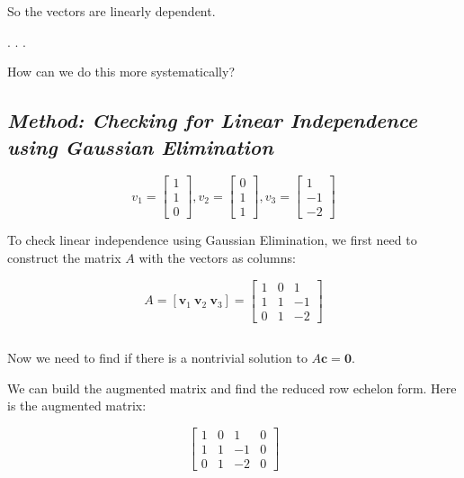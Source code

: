 \documentclass[
  letterpaper,
  DIV=11,
  numbers=noendperiod]{scrartcl}
\begin{document}
So the vectors are linearly dependent.

. . .

How can we do this more systematically?

\subsection{\texorpdfstring{\emph{Method: Checking for Linear
Independence using Gaussian
Elimination}}{Method: Checking for Linear Independence using Gaussian Elimination}}\label{method-checking-for-linear-independence-using-gaussian-elimination}

\[
 v_1 = \left[\begin{array}{l}1 \\ 1 \\ 0\end{array}\right], v_2 = \left[\begin{array}{l}0 \\ 1 \\ 1\end{array}\right], v_3 = \left[\begin{array}{r}1 \\ -1 \\ -2\end{array}\right]
\]

To check linear independence using Gaussian Elimination, we first need
to construct the matrix \(A\) with the vectors as columns:

\[
A = \left[\mathbf{v}_1\ \mathbf{v}_2\ \mathbf{v}_3\right]
= \left[\begin{array}{rrr}
1 & 0 & 1 \\
1 & 1 & -1 \\
0 & 1 & -2
\end{array}\right]
\]

\subsection{\texorpdfstring{\emph{}}{}}\label{section}

Now we need to find if there is a nontrivial solution to
\(A \mathbf{c}=\mathbf{0}\).

We can build the augmented matrix and find the reduced row echelon form.
Here is the augmented matrix:

\[
\left[\begin{array}{rrr|r}
1 & 0 & 1 & 0 \\
1 & 1 & -1 & 0 \\
0 & 1 & -2 & 0
\end{array}\right]
\]
\end{document}
